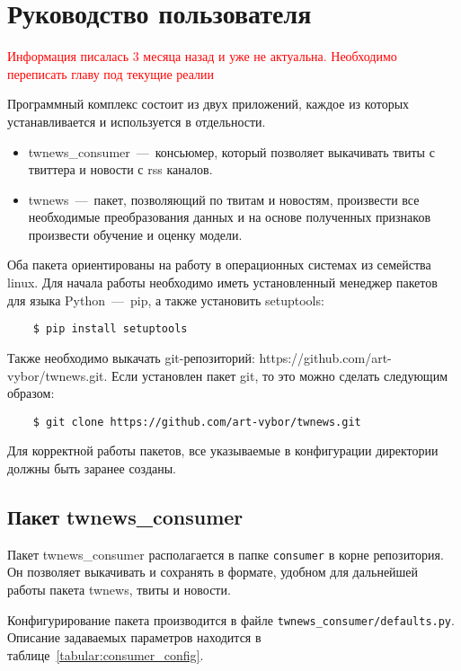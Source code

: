\section{Руководство пользователя}
    \textcolor{red}{Информация писалась 3 месяца назад и уже не актуальна. Необходимо переписать главу под текущие реалии}

    Программный комплекс состоит из двух приложений, каждое из которых устанавливается и используется в отдельности.
    \begin{itemize}
        \item twnews\_consumer~---~консьюмер, который позволяет выкачивать твиты с твиттера и новости с rss каналов.
        \item twnews~---~пакет, позволяющий по твитам и новостям, произвести все необходимые преобразования данных и на основе полученных признаков произвести обучение и оценку модели.
    \end{itemize}

    Оба пакета ориентированы на работу в операционных системах из семейства linux. Для начала работы необходимо иметь установленный менеджер пакетов для языка Python~---~pip, а также установить setuptools:
    \begin{lstlisting}
    $ pip install setuptools
    \end{lstlisting}
    Также необходимо выкачать git-репозиторий: https://github.com/art-vybor/twnews.git.
    Если установлен пакет git, то это можно сделать следующим образом:
    \begin{lstlisting}
    $ git clone https://github.com/art-vybor/twnews.git
    \end{lstlisting}

    Для корректной работы пакетов, все указываемые в конфигурации директории должны быть заранее созданы.

    \subsection{Пакет twnews\_consumer}
        Пакет twnews\_consumer располагается в папке \lstinline{consumer} в корне репозитория.
        Он позволяет выкачивать и сохранять в формате, удобном для дальнейшей работы пакета twnews, твиты и новости.

        Конфигурирование пакета производится в файле \lstinline{twnews_consumer/defaults.py}.
        Описание задаваемых параметров находится в таблице~\ref{tabular:consumer_config}.

